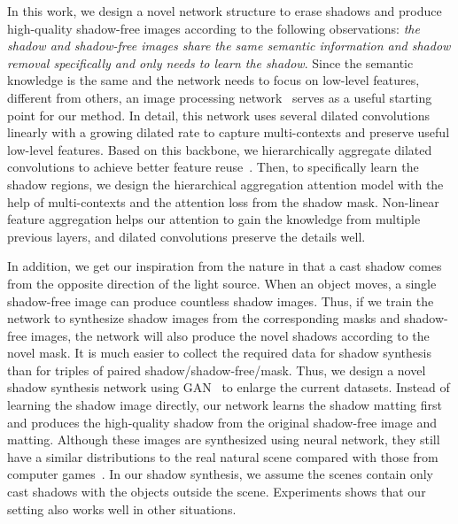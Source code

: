 \documentclass[letterpaper]{article} \usepackage{aaai20}  \usepackage{times}  \usepackage{helvet} \usepackage{courier}  \usepackage[hyphens]{url}  \urlstyle{rm} \def\UrlFont{\rm}  \usepackage{graphicx}  \frenchspacing  \setlength{\pdfpagewidth}{8.5in}  \setlength{\pdfpageheight}{11in}  \usepackage{amssymb}
\begin{document}
In this work, we design a novel network structure to erase shadows and produce high-quality shadow-free images according to the following observations: \textit{the shadow and shadow-free images share the same semantic information and shadow removal specifically and only needs to learn the shadow}. Since the semantic knowledge is the same and the network needs to focus on low-level features, different from others, an image processing network~\cite{chen2017fast} serves as a useful starting point for our method. In detail, this network uses several dilated convolutions~\cite{yu2015multi} linearly with a growing dilated rate to capture multi-contexts and preserve useful low-level features. Based on this backbone, we hierarchically aggregate dilated convolutions to achieve better feature reuse~\cite{Yu:2017ts}. Then, to specifically learn the shadow regions, we design the hierarchical aggregation attention model with the help of multi-contexts and the attention loss from the shadow mask. Non-linear feature aggregation helps our attention to gain the knowledge from multiple previous layers, and dilated convolutions preserve the details well. 


In addition, we get our inspiration from the nature in that a cast shadow comes from the opposite direction of the light source. When an object moves, a single shadow-free image can produce countless shadow images. Thus, if we train the network to synthesize shadow images from the corresponding masks and shadow-free images, the network will also produce the novel shadows according to the novel mask. It is much easier to collect the required data for shadow synthesis than for triples of paired shadow/shadow-free/mask. Thus, we design a novel shadow synthesis network using GAN~\cite{goodfellow2014generative} to enlarge the current datasets. Instead of learning the shadow image directly, our network learns the shadow matting first and produces the high-quality shadow from the original shadow-free image and matting.
Although these images are synthesized using neural network, they still have a similar distributions to the real natural scene compared with those from computer games~\cite{sidorov2019conditional}. In our shadow synthesis, we assume the scenes contain only cast shadows with the objects outside the scene. Experiments shows that our setting also works well in other situations.
\end{document}
